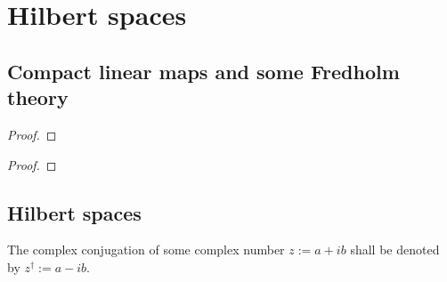 \section{Hilbert spaces}
    \subsection{Compact linear maps and some Fredholm theory}
        \begin{proposition} \label{prop: compact_linear_maps}
        \end{proposition}
            \begin{proof}
                
            \end{proof}

        \begin{proposition} \label{prop: weakly_bounded_sequences}
        \end{proposition}
            \begin{proof}
                
            \end{proof}

    \subsection{Hilbert spaces}
        \begin{convention}
            The complex conjugation of some complex number $z := a + ib$ shall be denoted by $z^{\dagger} := a - ib$.
        \end{convention}
    
